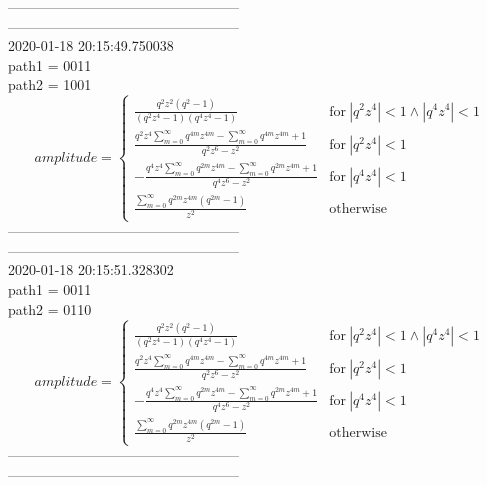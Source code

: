 \documentclass{jsreport}
\begin{document}
--------------------------------------------------\\
--------------------------------------------------\\
2020-01-18 20:15:49.750038\\
path1 = 0011\\
path2 = 1001\\
$$amplitude = \begin{cases} \frac{q^{2} z^{2} \left(q^{2} - 1\right)}{\left(q^{2} z^{4} - 1\right) \left(q^{4} z^{4} - 1\right)} & \text{for}\: \left|{q^{2} z^{4}}\right| < 1 \wedge \left|{q^{4} z^{4}}\right| < 1 \\\frac{q^{2} z^{4} \sum_{m=0}^{\infty} q^{4 m} z^{4 m} - \sum_{m=0}^{\infty} q^{4 m} z^{4 m} + 1}{q^{2} z^{6} - z^{2}} & \text{for}\: \left|{q^{2} z^{4}}\right| < 1 \\- \frac{q^{4} z^{4} \sum_{m=0}^{\infty} q^{2 m} z^{4 m} - \sum_{m=0}^{\infty} q^{2 m} z^{4 m} + 1}{q^{4} z^{6} - z^{2}} & \text{for}\: \left|{q^{4} z^{4}}\right| < 1 \\\frac{\sum_{m=0}^{\infty} q^{2 m} z^{4 m} \left(q^{2 m} - 1\right)}{z^{2}} & \text{otherwise} \end{cases}$$
--------------------------------------------------\\
--------------------------------------------------\\
2020-01-18 20:15:51.328302\\
path1 = 0011\\
path2 = 0110\\
$$amplitude = \begin{cases} \frac{q^{2} z^{2} \left(q^{2} - 1\right)}{\left(q^{2} z^{4} - 1\right) \left(q^{4} z^{4} - 1\right)} & \text{for}\: \left|{q^{2} z^{4}}\right| < 1 \wedge \left|{q^{4} z^{4}}\right| < 1 \\\frac{q^{2} z^{4} \sum_{m=0}^{\infty} q^{4 m} z^{4 m} - \sum_{m=0}^{\infty} q^{4 m} z^{4 m} + 1}{q^{2} z^{6} - z^{2}} & \text{for}\: \left|{q^{2} z^{4}}\right| < 1 \\- \frac{q^{4} z^{4} \sum_{m=0}^{\infty} q^{2 m} z^{4 m} - \sum_{m=0}^{\infty} q^{2 m} z^{4 m} + 1}{q^{4} z^{6} - z^{2}} & \text{for}\: \left|{q^{4} z^{4}}\right| < 1 \\\frac{\sum_{m=0}^{\infty} q^{2 m} z^{4 m} \left(q^{2 m} - 1\right)}{z^{2}} & \text{otherwise} \end{cases}$$
--------------------------------------------------\\
--------------------------------------------------\\
\end{document}
